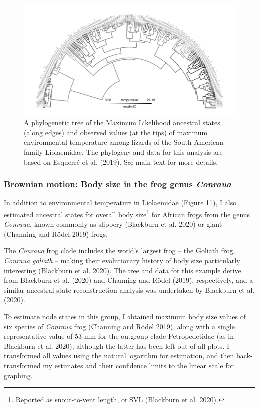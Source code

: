 \documentclass{article}
\begin{document}
\begin{figure}
\includegraphics[width=1\linewidth]{Revell.AncestralReconstruction_files/figure-latex/fig11-1} \caption{A phylogenetic tree of the Maximum Likelihood ancestral states (along edges) and observed values (at the tips) of maximum environmental temperature among lizards of the South American family Liolaemidae. The phylogeny and data for this analysis are based on Esquerré et al. (2019). See main text for more details.}\label{fig:fig11}
\end{figure}

\subsubsection{\texorpdfstring{Brownian motion: Body size in the frog genus \emph{Conraua}}{Brownian motion: Body size in the frog genus Conraua}}\label{brownian-motion-body-size-in-the-frog-genus-conraua}

In addition to environmental temperature in Liolaemidae (Figure 11), I also estimated ancestral states for overall body size\footnote{Reported as snout-to-vent length, or SVL (Blackburn et al. 2020).} for African frogs from the genus \emph{Conraua}, known commonly as slippery (Blackburn et al. 2020) or giant (Channing and Rödel 2019) frogs.

The \emph{Conraua} frog clade includes the world's largest frog -- the Goliath frog, \emph{Conraua goliath} -- making their evolutionary history of body size particularly interesting (Blackburn et al. 2020). The tree and data for this example derive from Blackburn et al. (2020) and Channing and Rödel (2019), respectively, and a similar ancestral state reconstruction analysis was undertaken by Blackburn et al. (2020).

To estimate node states in this group, I obtained maximum body size values of six species of \emph{Conraua} frog (Channing and Rödel 2019), along with a single representative value of 53 mm for the outgroup clade Petropedetidae (as in Blackburn et al. 2020), although the latter has been left out of all plots. I transformed all values using the natural logarithm for estimation, and then back-transformed my estimates and their confidence limits to the linear scale for graphing.
\end{document}
